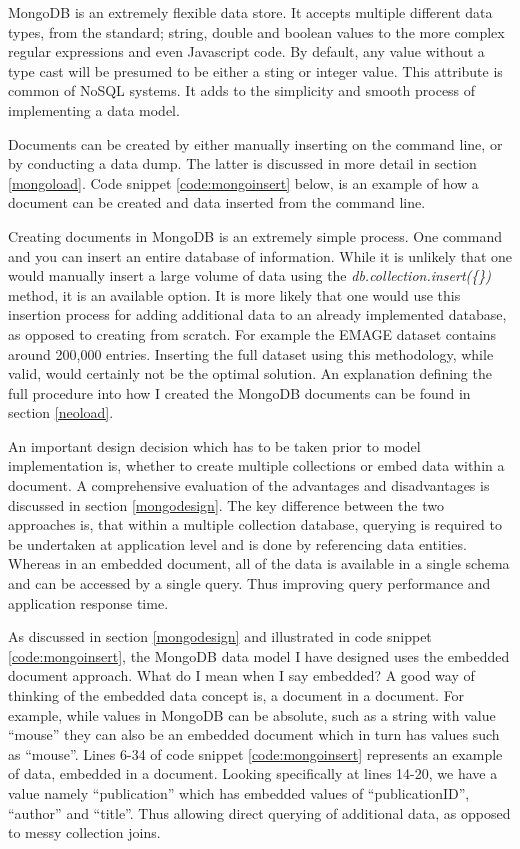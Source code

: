 MongoDB is an extremely flexible data store. It accepts multiple different data types, from the standard; string, double and boolean values to the more complex regular expressions and even Javascript code. By default, any value without a type cast will be presumed to be either a sting or integer value. This attribute is common of NoSQL systems. It adds to the simplicity and smooth process of implementing a data model.

Documents can be created by either manually inserting on the command line, or by conducting a data dump. The latter is discussed in more detail in section \ref{mongoload}. Code snippet \ref{code:mongoinsert} below, is an example of how a document can be created and data inserted from the command line.

Creating documents in MongoDB is an extremely simple process. One command and you can insert an entire database of information. While it is unlikely that one would manually insert a large volume of data using the \textit{db.collection.insert(\{\})} method, it is an available option. It is more likely that one would use this insertion process for adding additional data to an already implemented database, as opposed to creating from scratch. For example the EMAGE dataset contains around 200,000 entries. Inserting the full dataset using this methodology, while valid, would certainly not be the optimal solution. An explanation defining the full procedure into how I created the MongoDB documents can be found in section \ref{neoload}.

An important design decision which has to be taken prior to model implementation is, whether to create multiple collections or embed data within a document. A comprehensive evaluation of the advantages and disadvantages is discussed in section \ref{mongodesign}. The key difference between the two approaches is, that within a multiple collection database, querying is required to be undertaken at application level and is done by referencing data entities. Whereas in an embedded document, all of the data is available in a single schema and can be accessed by a single query. Thus improving query performance and application response time.

As discussed in section \ref{mongodesign} and illustrated in code snippet \ref{code:mongoinsert}, the MongoDB data model I have designed uses the embedded document approach. What do I mean when I say embedded? A good way of thinking of the embedded data concept is, a document in a document. For example, while values in MongoDB can be absolute, such as a string with value ``mouse'' they can also be an embedded document which in turn has values such as ``mouse''. Lines 6-34 of code snippet \ref{code:mongoinsert} represents an example of data, embedded in a document. Looking specifically at lines 14-20, we have a value namely ``publication'' which has embedded values of ``publicationID'', ``author'' and ``title''. Thus allowing direct querying of additional data, as opposed to messy collection joins.

